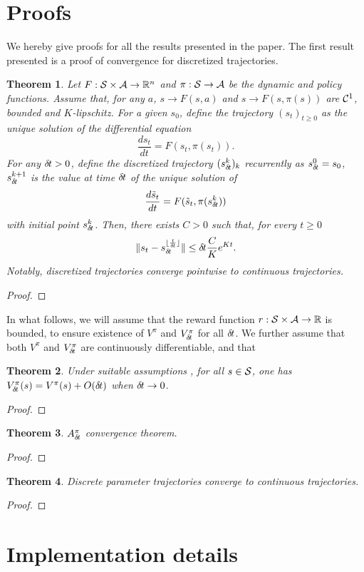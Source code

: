 \documentclass[11pt]{article}
\newtheorem{theorem}{Theorem}
\begin{document}
\section{Proofs}
We hereby give proofs for all the results presented in the paper.
The first result presented is a proof of convergence for discretized
trajectories.
\begin{theorem}
	Let $F: {\cal S} \times {\cal A} \rightarrow \mathbb{R}^n$ and $\pi: {\cal S}
	\rightarrow {\cal A}$ be the dynamic and policy functions. Assume that,
	for any $a$, $s \rightarrow F(s, a)$ and $s \rightarrow F(s, \pi(s))$
	are ${\cal C}^1$, bounded and $K$-lipschitz.  For
	a given $s_0$, define the trajectory $(s_t)_{t\geq 0}$ as the unique
	solution of the differential equation
	\begin{equation}
		\frac{ds_t}{dt} = F(s_t, \pi(s_t)).
		\label{eq:diff}
	\end{equation}
	For any ${\delta\hspace{-.1em}t} > 0$, define the discretized trajectory
	$(s_{\delta\hspace{-.1em}t}^k)_k$ recurrently as $s_{\delta\hspace{-.1em}t}^0 = s_0$,
	$s_{\delta\hspace{-.1em}t}^{k + 1}$ is the value at time ${\delta\hspace{-.1em}t}$ of
	the unique solution of
	\begin{equation}
		\frac{d\tilde{s}_t}{dt} = F(\tilde{s}_t, \pi(s_{\delta\hspace{-.1em}t}^k))
	\end{equation}
	with initial point $s_{\delta\hspace{-.1em}t}^k$.
	Then, there exists $C > 0$ such that, for every $t \geq 0$
	\begin{equation}
		\|s_t - s_{\delta\hspace{-.1em}t}^{\lfloor \frac{t}{{\delta\hspace{-.1em}t}} \rfloor}\|
		\leq {\delta\hspace{-.1em}t} \frac{C}{K}e^{Kt}.
	\end{equation}
	Notably, discretized trajectories converge pointwise to continuous trajectories.
	\label{th:traj-conv}
\end{theorem}
\begin{proof}
	
\end{proof}
In what follows, we will assume that the reward function $r: {\cal S} \times {\cal A} \rightarrow \mathbb{R}$
is bounded, to ensure existence of $V^\pi$ and $V^\pi_{\delta\hspace{-.1em}t}$ for all ${\delta\hspace{-.1em}t}$. We further assume that
both $V^\pi$ and $V^\pi_{\delta\hspace{-.1em}t}$ are continuously differentiable, and that 
\begin{theorem}
	Under suitable assumptions , for all $s \in {\cal
	S}$, one has
	$V^\pi_{\delta\hspace{-.1em}t}(s) = V^\pi(s) + O({\delta\hspace{-.1em}t})$
	when ${\delta\hspace{-.1em}t}\to 0$.
	\label{th:conv-value}
\end{theorem}
\begin{proof}
	
\end{proof}
\begin{theorem}
	$A^\pi_{\delta\hspace{-.1em}t}$ convergence theorem.
\end{theorem}
\begin{proof}
	
\end{proof}
\begin{theorem}
	Discrete parameter trajectories converge to continuous trajectories.
\end{theorem}
\begin{proof}
	
\end{proof}
\section{Implementation details}
\end{document}
